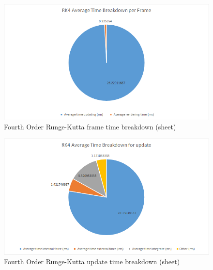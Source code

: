     \begin{figure}
    \begin{center}
      \includegraphics[scale=.9]{Figures/sheet_rk4_ft}
    \end{center}
    \caption{Fourth Order Runge-Kutta frame time breakdown (sheet)}
    \label{fig:rk4 ft sheet}
  \end{figure}
  
    \begin{figure}
    \begin{center}
      \includegraphics[scale=.9]{Figures/sheet_rk4_ut}
    \end{center}
    \caption{Fourth Order Runge-Kutta update time breakdown (sheet)}
    \label{fig:rk4 ut sheet}
  \end{figure}    

